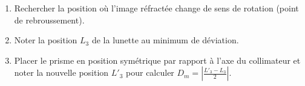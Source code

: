 \begin{enumerate}
    \item Rechercher la position où l'image réfractée change de sens de rotation (point de rebroussement).
    \item Noter la position $L_3$ de la lunette au minimum de déviation.
    \item Placer le prisme en position symétrique par rapport à l'axe du collimateur et noter la nouvelle position $L'_3$ pour calculer $D_m = \left| \frac{L'_3 - L_3}{2} \right|$.
\end{enumerate}
